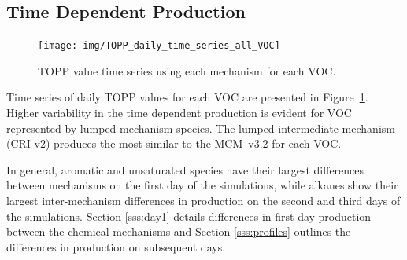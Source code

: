 \subsection[Time Dependent Ox Production]{Time Dependent  Production}
%
\begin{figure}
    \centering
    \texttt{[image: img/TOPP\_daily\_time\_series\_all\_VOC]}
    \vspace{0mm}
    \caption{TOPP value time series using each mechanism for each VOC.}
    \vspace{-4mm}
    \label{f:TOPP_dailies}
\end{figure}
%
Time series of daily TOPP values for each VOC are presented in \mbox{Figure \ref{f:TOPP_dailies}}. 
Higher variability in the time dependent  production is evident for VOC represented by lumped mechanism species.
The lumped intermediate mechanism (CRI v2) produces the most similar  to the \mbox{MCM v3.2} for each VOC.

In general, aromatic and unsaturated species have their largest differences between mechanisms on the first day of the simulations, while alkanes show their largest inter-mechanism differences in  production on the second and third days of the simulations.
Section \ref{sss:day1} details differences in first day  production between the chemical mechanisms and Section \ref{sss:profiles} outlines the differences in  production on subsequent days.
%
